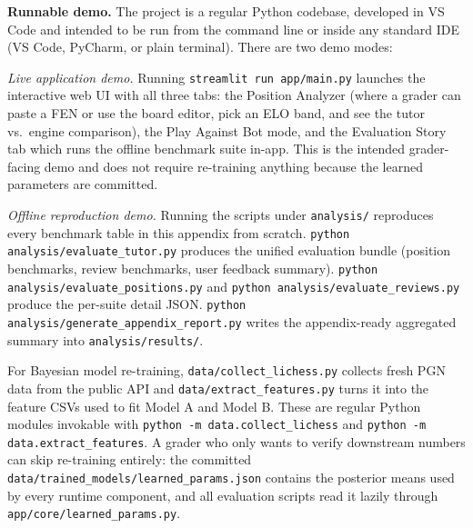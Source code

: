 \documentclass[11pt]{article}
\begin{document}
\textbf{Runnable demo.} The project is a regular Python codebase, developed in VS Code and intended to be run from the command line or inside any standard IDE (VS Code, PyCharm, or plain terminal). There are two demo modes:

\emph{Live application demo.} Running \texttt{streamlit run app/main.py} launches the interactive web UI with all three tabs: the Position Analyzer (where a grader can paste a FEN or use the board editor, pick an ELO band, and see the tutor vs.\ engine comparison), the Play Against Bot mode, and the Evaluation Story tab which runs the offline benchmark suite in-app. This is the intended grader-facing demo and does not require re-training anything because the learned parameters are committed.

\emph{Offline reproduction demo.} Running the scripts under \texttt{analysis/} reproduces every benchmark table in this appendix from scratch. \texttt{python analysis/evaluate\_tutor.py} produces the unified evaluation bundle (position benchmarks, review benchmarks, user feedback summary). \texttt{python analysis/evaluate\_positions.py} and \texttt{python analysis/evaluate\_reviews.py} produce the per-suite detail JSON. \texttt{python analysis/generate\_appendix\_report.py} writes the appendix-ready aggregated summary into \texttt{analysis/results/}.

For Bayesian model re-training, \texttt{data/collect\_lichess.py} collects fresh PGN data from the public API and \texttt{data/extract\_features.py} turns it into the feature CSVs used to fit Model A and Model B. These are regular Python modules invokable with \texttt{python -m data.collect\_lichess} and \texttt{python -m data.extract\_features}. A grader who only wants to verify downstream numbers can skip re-training entirely: the committed \texttt{data/trained\_models/learned\_params.json} contains the posterior means used by every runtime component, and all evaluation scripts read it lazily through \texttt{app/core/learned\_params.py}.
\end{document}
